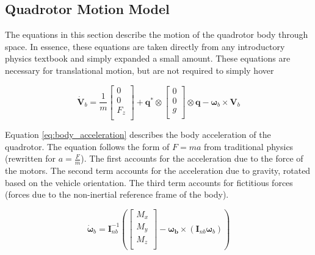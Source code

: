 \documentclass{article}
\numberwithin{equation}{section} %
\begin{document}
\subsection{Quadrotor Motion Model}
The equations in this section describe the motion of the quadrotor body through space. In essence, these equations are taken directly from any introductory physics textbook and simply expanded a small amount. These equations are necessary for translational motion, but are not required to simply hover

\begin{equation} \label{eq:body_acceleration}
\dot{\boldsymbol{V}}_b = \frac{1}{m} 
	\left[
		\begin{array}{c}
			0 \\
			0 \\
			F_z \\
		\end{array}
	\right]
	+ \boldsymbol{q}^* \otimes
		\left[
			\begin{array}{c}
				0 \\
				0 \\
				g \\
			\end{array}
		\right]
	\otimes \boldsymbol{q} - \boldsymbol{\omega}_b \times \boldsymbol{V}_b
\end{equation}

Equation \eqref{eq:body_acceleration} describes the body acceleration of the quadrotor. The equation follows the form of $F = ma$ from traditional physics (rewritten for $a = \frac{F}{m}$). The first accounts for the acceleration due to the force of the motors. The second term accounts for the acceleration due to gravity, rotated based on the vehicle orientation. The third term accounts for fictitious forces (forces due to the non-inertial reference frame of the body).

\begin{equation} \label{eq:body_angular_acceleration}
\dot{\boldsymbol{\omega}}_b = \boldsymbol{I}^{-1}_{nb}
	\left(
		\left[
			\begin{array}{c}
				M_x \\
				M_y \\
				M_z \\
			\end{array}
		\right]
		- \boldsymbol{\omega_b} \times \left( \boldsymbol{I}_{nb} \boldsymbol{\omega}_b \right)
	\right)
\end{equation}
\end{document}
